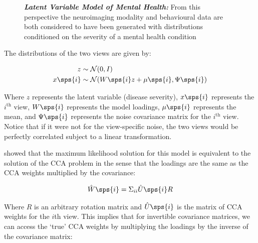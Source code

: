 \begin{figure}
    \centering
    \caption[Latent Variable Model of Mental Health]{\textit{\textbf{Latent Variable Model of Mental Health:}} From this perspective the neuroimaging modality and behavioural data are both considered to have been generated with distributions conditioned on the severity of a mental health condition}\label{fig:mentalhealthselfsupervised}
\end{figure}

The distributions of the two views are given by:

\begin{align}
    z& \sim \mathcal{N}(0, I)\\
    x\sps{i} & \sim \mathcal{N}(W\sps{i} z + \mu\sps{i}, \Psi\sps{i})
\end{align}

Where \(z\) represents the latent variable (disease severity), \(x\sps{i}\) represents the $i^{\text{th}}$ view, \(W\sps{i}\) represents the model loadings, \(\mu\sps{i}\) represents the mean, and \(\Psi\sps{i}\) represents the noise covariance matrix for the $i^{\text{th}}$ view.
Notice that if it were not for the view-specific noise, the two views would be perfectly correlated subject to a linear transformation.

\citep{bach2005probabilistic} showed that the maximum likelihood solution for this model is equivalent to the solution of the CCA problem in the sense that the loadings are the same as the CCA weights multiplied by the covariance:

\begin{align}\label{eq:probabilistic-cca}
    \hat{W}\sps{i} = \Sigma_{ii} \hat{U}\sps{i} R
\end{align}

Where $R$ is an arbitrary rotation matrix and $\hat{U}\sps{i}$ is the matrix of CCA weights for the $i$th view.
This implies that for invertible covariance matrices, we can access the `true' CCA weights by multiplying the loadings by the inverse of the covariance matrix:

